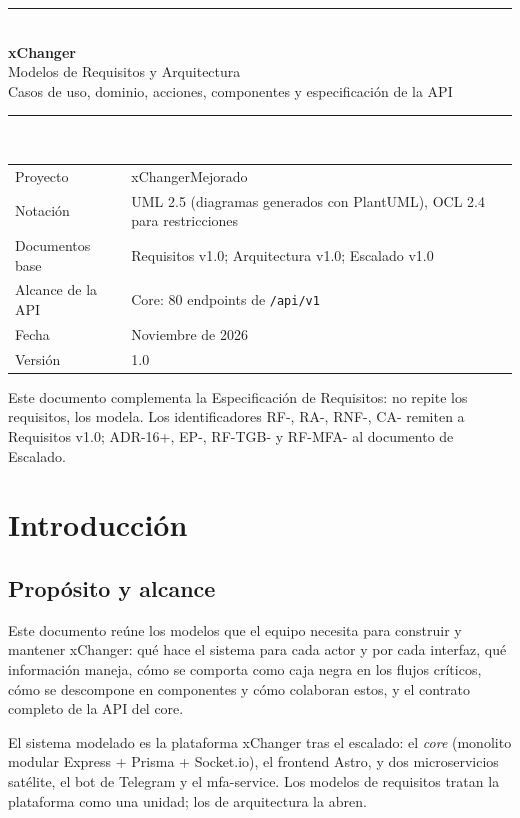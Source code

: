 \documentclass[11pt,a4paper]{report}
\begin{document}
\begin{titlepage}
\centering
\vspace*{3cm}
{\color{marca}\rule{\linewidth}{1pt}}\\[0.6cm]
{\Huge\bfseries xChanger\\[0.3cm]}
{\LARGE Modelos de Requisitos y Arquitectura\\[0.3cm]}
{\large Casos de uso, dominio, acciones, componentes y especificación de la API}\\[0.4cm]
{\color{marca}\rule{\linewidth}{1pt}}\\[2cm]
\begin{tabular}{@{}ll@{}}
\toprule
Proyecto & xChangerMejorado \\
Notación & UML 2.5 (diagramas generados con PlantUML), OCL 2.4 para restricciones \\
Documentos base & Requisitos v1.0; Arquitectura v1.0; Escalado v1.0 \\
Alcance de la API & Core: 80 endpoints de \texttt{/api/v1} \\
Fecha & Noviembre de 2026 \\
Versión & 1.0 \\
\bottomrule
\end{tabular}
\vfill
{\small Este documento complementa la Especificación de Requisitos: no repite los requisitos, los modela. Los identificadores RF-, RA-, RNF-, CA- remiten a Requisitos v1.0; ADR-16+, EP-, RF-TGB- y RF-MFA- al documento de Escalado.}
\end{titlepage}

\tableofcontents

\chapter{Introducción}

\section{Propósito y alcance}
Este documento reúne los modelos que el equipo necesita para construir y mantener xChanger: qué hace el sistema para cada actor y por cada interfaz, qué información maneja, cómo se comporta como caja negra en los flujos críticos, cómo se descompone en componentes y cómo colaboran estos, y el contrato completo de la API del core.

El sistema modelado es la plataforma xChanger tras el escalado: el \emph{core} (monolito modular Express + Prisma + Socket.io), el frontend Astro, y dos microservicios satélite, el bot de Telegram y el mfa-service. Los modelos de requisitos tratan la plataforma como una unidad; los de arquitectura la abren.
\end{document}
